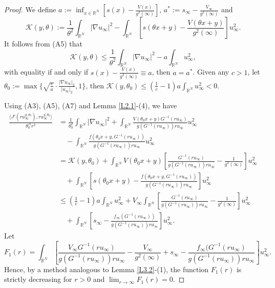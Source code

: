 \documentclass[10pt,a4paper]{amsart}
\numberwithin{equation}{section}
\begin{document}
\begin{proof}
We define $a:=\inf_{x\in{\mathbb{R}^N}}[s(x)-\frac{V(x)}{g^2(\infty)}]$, 
$a^*:=s_\infty-\frac{V_\infty}{g^2(\infty)}$ and 
$$
\mathcal{K}(y,\theta):=\frac{1}{\theta^2}\int_{\mathbb{R}^N}|\nabla u_\infty|^2-\int_{\mathbb{R}^N}[s(\theta x+y)-\frac{V(\theta x+y)}{g^2(\infty)}]u_\infty^2.
$$
It follows from (A5) that
$$
\mathcal{K}(y,\theta)\leq\frac{1}{\theta^2}\int_{\mathbb{R}^N}|\nabla u_\infty|^2-a\int_{\mathbb{R}^N}u_\infty^2,
$$
with equality if and only if $s(x)-\frac{V(x)}{g^2(\infty)}\equiv a$, then $a=a^*$. 
Given any  $c > 1$, let 
$\theta_0:=\max\{\sqrt{\frac{c}{a}}\cdot\frac{|\nabla u_\infty|_2}{|u_\infty|_2},1\}$, then 
$\mathcal{K}(y,\theta_0)\leq(\frac{1}{c}-1)a\int_{\mathbb{R}^N}u_\infty^2<0$.

Using (A3), (A5), (A7) and Lemma \ref{L2.1}-(4), we have 
\begin{align*}
\frac{\langle J'(ru_{\infty}^{y,\theta_0}),ru_{\infty}^{y,\theta_0}\rangle}{\theta^N_0r^{2}} 
&=\frac{1}{\theta^2_0}\int_{\mathbb{R}^{N}} \vert \nabla u_{\infty} \vert^{2} + \int_{\mathbb{R}^{N}} \frac{V(\theta_0 x+y) G^{-1}(ru_{\infty})}{g(G^{-1}(ru_{\infty}))ru_{\infty}} u_{\infty}^{2} \\
 &\quad  - \int_{\mathbb{R}^{N}}  \frac{f(\theta_0 x+y,G^{-1}(ru_{\infty}))}{g(G^{-1}(ru_{\infty}))ru_{\infty}} u_{\infty}^{2} \\
&=\mathcal{K}(y,\theta_0)+\int_{\mathbb{R}^{N}} V(\theta_0 x+y)[\frac{ G^{-1}(ru_{\infty})}{g(G^{-1}(ru_{\infty}))ru_{\infty}}-\frac{1}{g^2(\infty)}]u_{\infty}^{2}\\
&\quad  +\int_{\mathbb{R}^{N}} [s(\theta_0 x+y)- \frac{f (\theta_0 x+y,G^{-1}(ru_{\infty}))}{g(G^{-1}(ru_{\infty}))ru_{\infty}}]u_{\infty}^{2}\\
&\leq(\frac{1}{c}-1)a\int_{\mathbb{R}^N}u_\infty^2+V_\infty\int_{\mathbb{R}^{N}} [\frac{ G^{-1}(ru_{\infty})}{g(G^{-1}(ru_{\infty}))ru_{\infty}}-\frac{1}{g^2(\infty)}]u_{\infty}^{2} \\
&\quad  +\int_{\mathbb{R}^{N}} [s_\infty- \frac{f_\infty(G^{-1}(ru_{\infty}))}{g(G^{-1}(ru_{\infty}))ru_{\infty}}]u_{\infty}^{2}.
\end{align*}
Let 
$$
F_1(r)=\int_{\mathbb{R}^{N}} [\frac{ V_\infty G^{-1}(ru_{\infty})}{g(G^{-1}(ru_{\infty}))ru_{\infty}}-\frac{V_\infty}{g^2(\infty)}+s_\infty- \frac{f_\infty(G^{-1}(ru_{\infty})}{g(G^{-1}(ru_{\infty}))ru_{\infty}}]u_{\infty}^{2}.
$$ 
Hence, by a method analogous to Lemma \ref{L3.2}-(1), the function \(F_1(r)\) is strictly 
decreasing for \(r > 0\) and $\lim_{r\to\infty}F_1(r)=0$. 

\end{proof}
\end{document}
